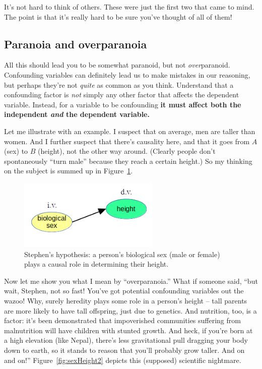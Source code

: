 It's not hard to think of others. These were just the first two that came to
mind. The point is that it's really hard to be sure you've thought of all of
them!


\subsection{Paranoia and overparanoia}

All this should lead you to be somewhat paranoid, but not
\textit{over}\-paranoid. Confounding variables can definitely lead us to make
mistakes in our reasoning, but perhaps they're not \textit{quite} as common as
you think. Understand that a confounding factor is \textit{not} simply any
other factor that affects the dependent variable. Instead, for a variable to be
confounding \textbf{it must affect both the independent \textit{and} the
dependent variable.}

Let me illustrate with an example. I suspect that on average, men are taller
than women. And I further suspect that there's causality here, and that it goes
from $A$ (sex) to $B$ (height), not the other way around. (Clearly people don't
spontaneously ``turn male'' because they reach a certain height.) So my
thinking on the subject is summed up in Figure~\ref{fig:sexHeight}.

\vspace{-.15in}
\begin{figure}[ht]
\centering
\includegraphics[width=0.6\textwidth]{sexHeight.png}
\caption{Stephen's hypothesis: a person's biological sex (male or female) plays
a causal role in determining their height.}
\label{fig:sexHeight}
\end{figure}

\smallskip
Now let me show you what I mean by ``overparanoia.'' What if someone said,
``but wait, Stephen, not so fast! You've got potential confounding variables
out the wazoo! Why, surely heredity plays some role in a person's height --
tall parents are more likely to have tall offspring, just due to genetics. And
nutrition, too, is a factor: it's been demonstrated that impoverished
communities suffering from malnutrition will have children with stunted growth.
And heck, if you're born at a high elevation (like Nepal), there's less
gravitational pull dragging your body down to earth, so it stands to reason
that you'll probably grow taller. And on and on!'' Figure~\ref{fig:sexHeight2}
depicts this (supposed) scientific nightmare.

